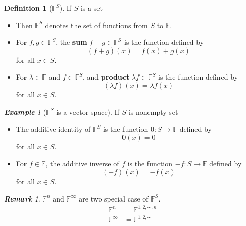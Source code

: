 \documentclass[paper=a4, fontsize=11pt]{scrartcl}
\numberwithin{equation}{section}		%
\numberwithin{figure}{section}			%
\numberwithin{table}{section}				%
\renewcommand{\to}{\ensuremath{\rightarrow}}
\theoremstyle{definition}
\newtheorem{definition}{Definition}[section]
\theoremstyle{remark}
\newtheorem*{remark}{\textbf{Remark}}
\theoremstyle{example}
\newtheorem{example}{\textbf{Example}}[section]
\begin{document}
\begin{definition}[$\mathbb{F}^{S}$]
    If $S$ is a set
    \begin{itemize}
        \item Then $\mathbb{F}^{S}$ denotes the set of functions from $S$ to $\mathbb{F}$.
        \item For $f,g \in \mathbb{F}^{S}$, the \textbf{sum} $f+g\in \mathbb{F}^{S}$ is the function defined by
        \begin{equation}
            (f+g)(x) = f(x) + g(x)
        \end{equation}
        for all $x \in S$.
        \item For $\lambda \in \mathbb{F}$ and $f \in \mathbb{F}^{S}$, and \textbf{product} $\lambda f \in \mathbb{F}^{S}$ is the function defined by
        \begin{equation}
            (\lambda f)(x) = \lambda f(x)
        \end{equation}
        for all $x \in S$.
    \end{itemize}
\end{definition}

\begin{example}[$\mathbb{F}^{S}$ is a vector space]
    If $S$ is nonempty set
    \begin{itemize}
        \item The additive identity of $\mathbb{F}^{S}$ is the function $0: S \to \mathbb{F}$ defined by
        \begin{equation}
            0(x) = 0
        \end{equation}
        for all $x \in S$.
        \item For $f \in \mathbb{F}$, the additive inverse of $f$ is the function $-f: S \to \mathbb{F}$ defined by
        \begin{equation}
            (-f)(x) = -f(x)
        \end{equation}
        for all $x \in S$.
    \end{itemize}
\end{example}

\begin{remark}
    $\mathbb{F}^{n}$ and $\mathbb{F}^{\infty}$ are two special case of $\mathbb{F}^{S}$.
    \begin{equation}
        \begin{aligned}
            \mathbb{F}^{n} &= \mathbb{F}^{1,2,\cdots,n}\\
            \mathbb{F}^{\infty} &= \mathbb{F}^{1,2,\cdots}
        \end{aligned}
    \end{equation}
\end{remark}
\end{document}
